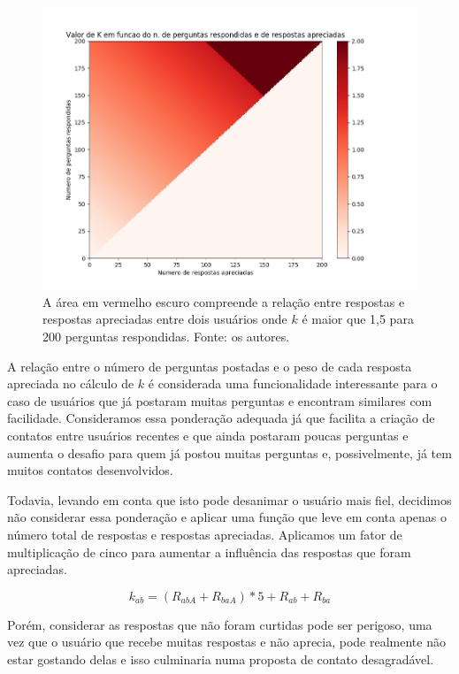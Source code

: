 \begin{figure}[!htb]
\centering
\includegraphics[width=14cm]{matriz_x1.png}
\caption{A área em vermelho escuro compreende a relação entre respostas e respostas apreciadas entre dois usuários onde $k$ é maior que 1,5 para 200 perguntas respondidas. Fonte: os autores.}
\label{fig:matriz_x1}
\end{figure}

A relação entre o número de perguntas postadas e o peso de cada resposta apreciada no cálculo de $k$ é considerada uma funcionalidade interessante para o caso de usuários que já postaram muitas perguntas e encontram similares com facilidade. Consideramos essa ponderação adequada já que facilita a criação de contatos entre usuários recentes e que ainda postaram poucas perguntas e aumenta o desafio para quem já postou muitas perguntas e, possivelmente, já tem muitos contatos desenvolvidos.

Todavia, levando em conta que isto pode desanimar o usuário mais fiel, decidimos não considerar essa ponderação e aplicar uma função que leve em conta apenas o número total de respostas e respostas apreciadas. Aplicamos um fator de multiplicação de cinco para aumentar a influência das respostas que foram apreciadas.

\begin{equation}
k_{ab} = (R_{abA} + R_{baA})*5 + R_{ab} + R_{ba}
\label{eq:k6}
\end{equation}

Porém, considerar as respostas que não foram curtidas pode ser perigoso, uma vez que o usuário que recebe muitas respostas e não aprecia, pode realmente não estar gostando delas e isso culminaria numa proposta de contato desagradável.

